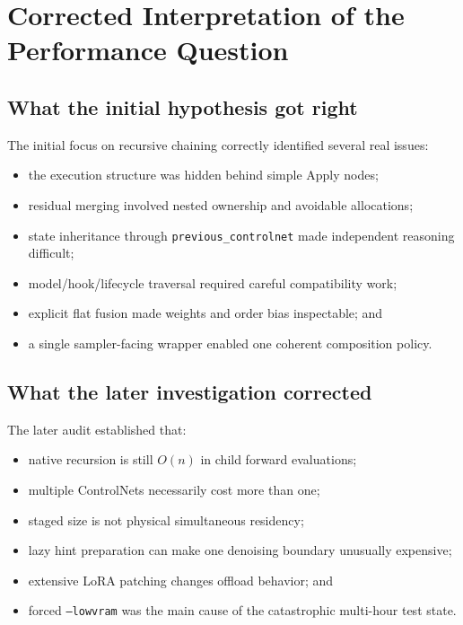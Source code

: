 \documentclass[11pt]{article}
\newcommand{\code}[1]{\texttt{#1}}
\begin{document}
\section{Corrected Interpretation of the Performance Question}

\subsection{What the initial hypothesis got right}

The initial focus on recursive chaining correctly identified several real issues:

\begin{itemize}
  \item the execution structure was hidden behind simple Apply nodes;
  \item residual merging involved nested ownership and avoidable allocations;
  \item state inheritance through \code{previous\_controlnet} made independent reasoning difficult;
  \item model/hook/lifecycle traversal required careful compatibility work;
  \item explicit flat fusion made weights and order bias inspectable; and
  \item a single sampler-facing wrapper enabled one coherent composition policy.
\end{itemize}

\subsection{What the later investigation corrected}

The later audit established that:

\begin{itemize}
  \item native recursion is still $O(n)$ in child forward evaluations;
  \item multiple ControlNets necessarily cost more than one;
  \item staged size is not physical simultaneous residency;
  \item lazy hint preparation can make one denoising boundary unusually expensive;
  \item extensive LoRA patching changes offload behavior; and
  \item forced \code{--lowvram} was the main cause of the catastrophic multi-hour test state.
\end{itemize}
\end{document}
